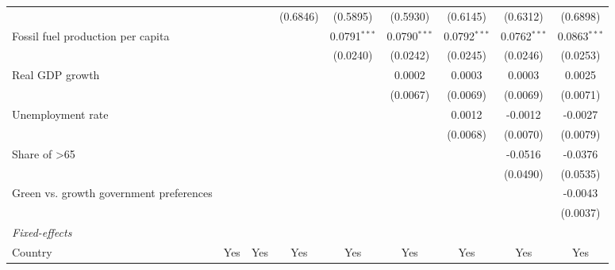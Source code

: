\begin{table}[htbp]
\begin{tabular}{lcccccccc}
                                                              &                 &          & (0.6846) & (0.5895)       & (0.5930)       & (0.6145)       & (0.6312)       & (0.6898)\\   
      Fossil fuel production per capita                       &                 &          &          & 0.0791$^{***}$ & 0.0790$^{***}$ & 0.0792$^{***}$ & 0.0762$^{***}$ & 0.0863$^{***}$\\   
                                                              &                 &          &          & (0.0240)       & (0.0242)       & (0.0245)       & (0.0246)       & (0.0253)\\   
      Real GDP growth                                         &                 &          &          &                & 0.0002         & 0.0003         & 0.0003         & 0.0025\\   
                                                              &                 &          &          &                & (0.0067)       & (0.0069)       & (0.0069)       & (0.0071)\\   
      Unemployment rate                                       &                 &          &          &                &                & 0.0012         & -0.0012        & -0.0027\\   
                                                              &                 &          &          &                &                & (0.0068)       & (0.0070)       & (0.0079)\\   
      Share of >65                                            &                 &          &          &                &                &                & -0.0516        & -0.0376\\   
                                                              &                 &          &          &                &                &                & (0.0490)       & (0.0535)\\   
      Green vs. growth government preferences                 &                 &          &          &                &                &                &                & -0.0043\\   
                                                              &                 &          &          &                &                &                &                & (0.0037)\\   
      \midrule
      \emph{Fixed-effects}\\
      Country                                                 & Yes             & Yes      & Yes      & Yes            & Yes            & Yes            & Yes            & Yes\\  

\end{tabular}
\end{table}

